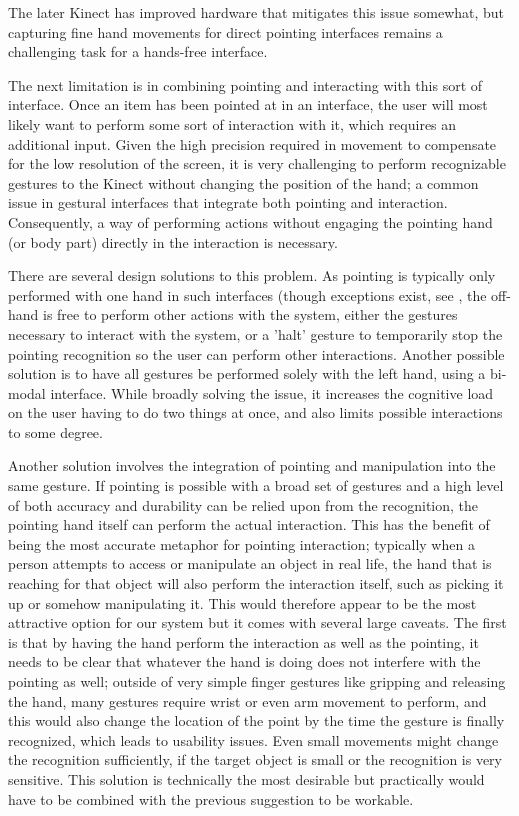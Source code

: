 The later Kinect has improved hardware that mitigates this issue somewhat, but capturing fine hand movements for direct pointing interfaces remains a challenging task for a hands-free interface. 

The next limitation is in combining pointing and interacting with this sort of interface. Once an item has been pointed at in an interface, the user will most likely want to perform some sort of interaction with it, which requires an additional input. Given the high precision required in movement to compensate for the low resolution of the screen, it is very challenging to perform recognizable gestures to the Kinect without changing the position of the hand; a common issue in gestural interfaces that integrate both pointing and interaction.  Consequently, a way of performing actions without engaging the pointing hand (or body part) directly in the interaction is necessary.

There are several design solutions to this problem. As pointing is typically only performed with one hand in such interfaces (though exceptions exist, see \cite{Bolt1992}, the off-hand is free to perform other actions with the system, either the gestures necessary to interact with the system, or a 'halt' gesture to temporarily stop the pointing recognition so the user can perform other interactions. Another possible solution is to have all gestures be performed solely with the left hand, using a bi-modal interface. While broadly solving the issue, it increases the cognitive load  on the user having to do two things at once, and also limits possible interactions to some degree.

Another solution involves the integration of pointing and manipulation into the same gesture. If pointing is possible with a broad set of gestures and a high level of both accuracy and durability can be relied upon from the recognition, the pointing hand itself can perform the actual interaction. This has the benefit of being the most accurate metaphor for pointing interaction; typically when a person attempts to access or manipulate an object in real life, the hand that is reaching for that object will also perform the interaction itself, such as picking it up or somehow manipulating it. This would therefore appear to be the most attractive option for our system but it comes with several large caveats. The first is that by having the hand perform the interaction as well as the pointing, it needs to be clear that whatever the hand is doing does not interfere with the pointing as well; outside of very simple finger gestures like gripping and releasing the hand, many gestures require wrist or even arm movement to perform, and this would also change the location of the point by the time the gesture is finally recognized, which leads to usability issues. Even small movements might change the recognition sufficiently, if the target object is small or the recognition is very sensitive. This solution is technically the most desirable but practically would have to be combined with the previous suggestion to be workable.

